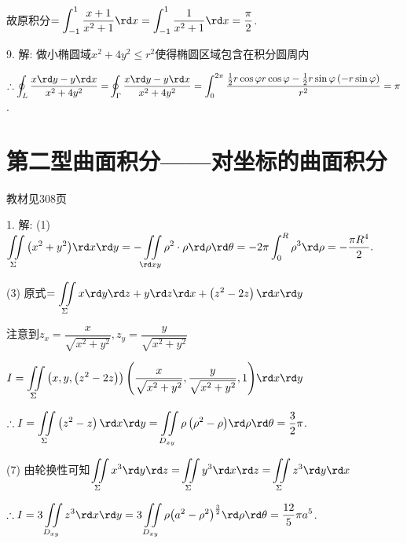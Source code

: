  故原积分$=\displaystyle\int_{-1}^{1}{\dfrac{x+1}{{{x}^{2}}+1}}\rd x=\displaystyle\int_{-1}^{1}{\dfrac{1}{{{x}^{2}}+1}\rd x}=\dfrac{\pi }{2}$.

  9. 解: 做小椭圆域${{x}^{2}}+4{{y}^{2}}\le {{r}^{2}}$使得椭圆区域包含在积分圆周内

  $\therefore \displaystyle\oint_{L}{\dfrac{x\rd y-y\rd x}{{{x}^{2}}+4{{y}^{2}}}=}\displaystyle\oint_{\Gamma }{\dfrac{x\rd y-y\rd x}{{{x}^{2}}+4{{y}^{2}}}=\displaystyle\int_{0}^{2\pi }{\dfrac{\frac{1}{2}r\cos \varphi r\cos \varphi -\frac{1}{2}r\sin \varphi \left( -r\sin \varphi  \right)}{{{r}^{2}}}}}=\pi $.

\section{第二型曲面积分——对坐标的曲面积分}
\begin{flushright}
  \color{zhanqing!80}
   教材见308页
\end{flushright}

  1. 解: (1)$\displaystyle\iint\limits  \limits_{\Sigma} {\left( {{x}^{2}}+{{y}^{2}} \right)}\rd x\rd y=-\iint\limits _{\rd xy}{{{\rho }^{2}}\cdot \rho \rd \rho }\rd \theta =-2\pi \displaystyle\int_{0}^{R}{{{\rho }^{3}}\rd \rho =-\dfrac{\pi {{R}^{4}}}{2}.}$

  (3) 原式$=\displaystyle\iint\limits  \limits_{\Sigma} {x\rd y\rd z+y\rd z\rd x+\left( {{z}^{2}}-2z \right)\rd x\rd y}$

  注意到${{z}_{x}}=\dfrac{x}{\sqrt{{{x}^{2}}+{{y}^{2}}}},{{z}_{y}}=\dfrac{y}{\sqrt{{{x}^{2}}+{{y}^{2}}}}$

  $I=\displaystyle\iint \limits\limits \limits_{\Sigma} {\left( x,y,\left( {{z}^{2}}-2z \right) \right)\left( \dfrac{x}{\sqrt{{{x}^{2}}+{{y}^{2}}}},\dfrac{y}{\sqrt{{{x}^{2}}+{{y}^{2}}}},1 \right)}\rd x\rd y$

  $\therefore I=\displaystyle\iint\limits  \limits_{\Sigma} {\left( {{z}^{2}}-z \right)\rd x\rd y=\iint\limits _{ D_{xy} }{\rho \left( {{\rho }^{2}}-\rho  \right)}}\rd \rho \rd \theta =\dfrac{3}{2}\pi $.

  (7) 由轮换性可知$\displaystyle\iint\limits\limits  \limits_{\Sigma} {{{x}^{3}}\rd y\rd z=}\iint\limits  \limits_{\Sigma} {{{y}^{3}}\rd x\rd z=}\iint\limits  \limits_{\Sigma} {{{z}^{3}}\rd y\rd x}$

  $\therefore I=3\displaystyle\iint\limits _{ D_{xy} }{{{z}^{3}}\rd x\rd y=3\iint\limits _{ D_{xy} }{\rho {{\left( {{a}^{2}}-{{\rho }^{2}} \right)}^{\frac{3}{2}}}\rd \rho }}\rd \theta =\dfrac{12}{5}\pi {{a}^{5}}$.

